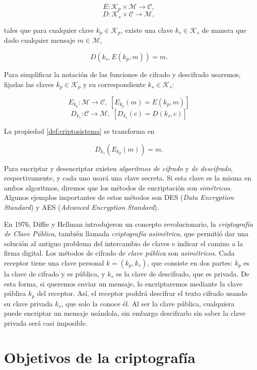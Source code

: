 $$E : \mathcal{K}_p \times \mathcal{M} \rightarrow \mathcal{C},$$
$$D : \mathcal{K}_s \times \mathcal{C} \rightarrow \mathcal{M},$$

tales que para cualquier clave $k_p \in \mathcal{K}_p$, existe una clave $k_s \in \mathcal{K}_s$ de manera que dado cualquier mensaje $m \in \mathcal{M}$,

\begin{equation}
    \label{def:criptosistema}
    D(k_s, E(k_p, m)) = m.
\end{equation}

Para simplificar la notación de las funciones de cifrado y descifrado usaremos, fijadas las claves $k_p \in \mathcal{K}_p$ y su correspondiente $k_s \in \mathcal{K}_s$:

$$E_{k_p} : \mathcal{M} \rightarrow \mathcal{C}, \; \left[ E_{k_p} (m) = E(k_p, m) \right]$$
$$D_{k_s} : \mathcal{C} \rightarrow \mathcal{M}, \; \left[ D_{k_s} (c) = D(k_s, c) \right]$$

La propiedad \ref{def:criptosistema} se transforma en

$$D_{k_s} \left( E_{k_p}(m) \right) = m.$$

Para encriptar y desencriptar existen \emph{algoritmos de cifrado} y \emph{de descifrado}, respectivamente, y cada uno usará una clave secreta. Si esta clave es la misma en ambos algoritmos, diremos que los métodos de encriptación son \emph{simétricos}. Algunos ejemplos importantes de estos métodos son DES (\emph{Data Encryption Standard}) y AES (\emph{Advanced Encryption Standard}).

En 1976, Diffie y Hellman introdujeron un concepto revolucionario, la \emph{criptografía de Clave Pública}, también llamada \emph{criptografía asimétrica}, que permitió dar una solución al antiguo problema del intercambio de claves e indicar el camino a la firma digital. Los métodos de cifrado de \emph{clave pública} son \emph{asimétricos}. Cada receptor tiene una clave personal $k = (k_p, k_s)$, que consiste en dos partes: $k_p$ es la clave de cifrado y es pública, y $k_s$ es la clave de descifrado, que es privada. De esta forma, si queremos enviar un mensaje, lo encriptaremos mediante la clave pública $k_p$ del receptor. Así, el receptor poddrá descifrar el texto cifrado usando su clave privada $k_s$, que solo la conoce él. Al ser la clave pública, cualquiera puede encriptar un mensaje usándola, sin embargo descifrarlo sin saber la clave privada será casi imposible.

\section{Objetivos de la criptografía}

